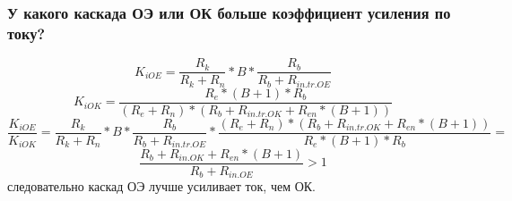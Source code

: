 \subsubsection{У какого каскада ОЭ или ОК больше коэффициент усиления по току?}

$$
K_{iOE}=\frac{R_{k}}{R_{k}+R_{n}}*B*\frac{R_{b}}{R_{b}+R_{in.tr.OE}}
$$
$$
K_{iOK}=\frac{R_{e}*(B+1)*R_{b}}{(R_{e}+R_{n})*(R_{b}+R_{in.tr.OK}+R_{en}*(B+1))}
$$
$$
\frac{K_{iOE}}{K_{iOK}}=\frac{R_{k}}{R_{k}+R_{n}}*B*\frac{R_{b}}{R_{b}+R_{in.tr.OE}}*\frac{(R_{e}+R_{n})*(R_{b}+R_{in.tr.OK}+R_{en}*(B+1))}{R_{e}*(B+1)*R_{b}}=
$$
$$
\frac{R_{b}+R_{in.OK}+R_{en}*(B+1)}{R_{b}+R_{in.OE}}>1
$$
следовательно каскад ОЭ лучше усиливает ток, чем ОК.
